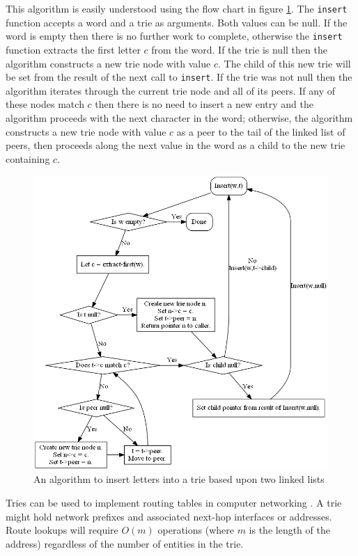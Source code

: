 \documentclass{book}
\begin{document}
This algorithm is easily understood using the flow chart in figure \ref{flowchart}. The \texttt{insert} function accepts a word and a trie as arguments. Both values can be null. If the word is empty then there is no further work to complete, otherwise the \texttt{insert} function extracts the first letter $c$ from the word. If the trie is null then the algorithm constructs a new trie node with value $c$. The child of this new trie will be set from the result of the next call to \texttt{insert}. If the trie was not null then the algorithm iterates through the current trie node and all of its peers. If any of these nodes match $c$ then there is no need to insert a new entry and the algorithm proceeds with the next character in the word; otherwise, the algorithm constructs a new trie node with value $c$ as a peer to the tail of the linked list of peers, then proceeds along the next value in the word as a child to the new trie containing $c$.

\begin{figure}[ht]
\centering
\includegraphics[width=5in]{ch-trie/flowchart}
\caption{An algorithm to insert letters into a trie based upon two linked lists}
\label{flowchart}
\end{figure}

Tries can be used to implement routing tables in computer networking \cite{nilsson1998}. A trie might hold network prefixes and associated next-hop interfaces or addresses. Route lookups will require $O(m)$ operations (where $m$ is the length of the address) regardless of the number of entities in the trie.
\end{document}
